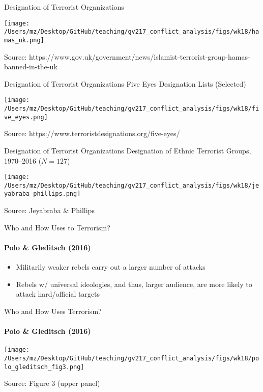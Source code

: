 \documentclass[handout]{beamer}
\begin{document}
\begin{frame}{Designation of Terrorist Organizations}
    \pause
    \begin{center}
        \texttt{[image: /Users/mz/Desktop/GitHub/teaching/gv217\_conflict\_analysis/figs/wk18/hamas\_uk.png]}
    \end{center}
    \footnotesize Source: https://www.gov.uk/government/news/islamist-terrorist-group-hamas-banned-in-the-uk
\end{frame}

\begin{frame}{Designation of Terrorist Organizations}
    \pause
    Five Eyes Designation Lists (Selected)
    \begin{center}
        \texttt{[image: /Users/mz/Desktop/GitHub/teaching/gv217\_conflict\_analysis/figs/wk18/five\_eyes.png]}
    \end{center}
    \footnotesize Source: https://www.terroristdesignations.org/five-eyes/
\end{frame}

\begin{frame}{Designation of Terrorist Organizations}
    \pause
    Designation of Ethnic Terrorist Groups, 1970--2016 (\(N = 127\))
    \begin{center}
        \texttt{[image: /Users/mz/Desktop/GitHub/teaching/gv217\_conflict\_analysis/figs/wk18/jeyabraba\_phillips.png]}
    \end{center}
    \footnotesize Source: Jeyabraba \& Phillips
\end{frame}

\begin{frame}{Who and How Uses to Terrorism?}
\framesubtitle{Polo \& Gleditsch (2016)}
    \begin{itemize}
        \pause\item Militarily weaker rebels carry out a larger number of attacks
        \pause\item Rebels w/ universal ideologies, and thus, larger audience, are more likely to attack hard/official targets
\end{itemize}
\end{frame}

\begin{frame}{Who and How Uses Terrorism?}
\framesubtitle{Polo \& Gleditsch (2016)}
    \begin{center}
        \texttt{[image: /Users/mz/Desktop/GitHub/teaching/gv217\_conflict\_analysis/figs/wk18/polo\_gleditsch\_fig3.png]}
    \end{center}
    \footnotesize Source: Figure 3 (upper panel)
\end{frame}
\end{document}
